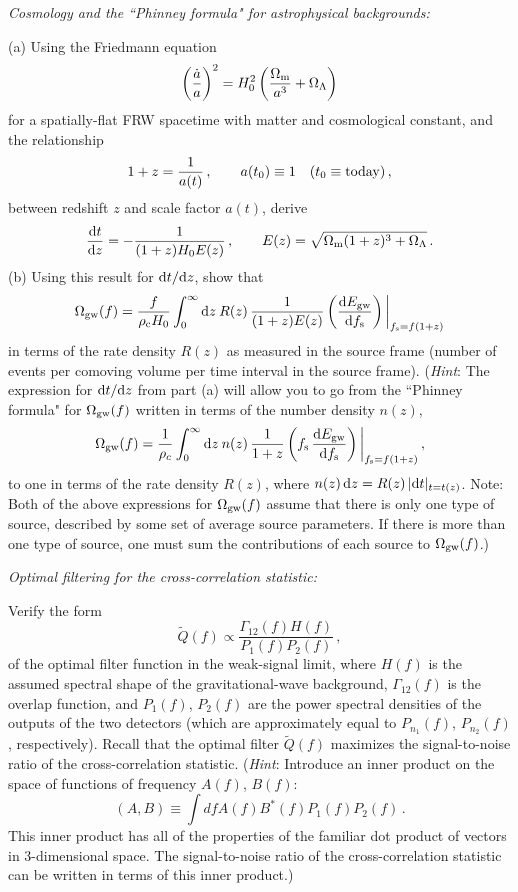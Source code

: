 \documentclass[11pt]{article}
\numberwithin{equation}{section}
\def\be{\begin{equation}}
\def\ee{\end{equation}}
\def\i{\item{}}
\def\D{{\rm d}}
\begin{document}
\i {\em Cosmology and the ``Phinney formula" for astrophysical backgrounds:}

(a) Using the Friedmann equation
%
\be
\left(\frac{\dot a}{a}\right)^2
=H_0^2\left(\frac{\Omega_{\rm m}}{a^{3}} + \Omega_\Lambda\right)
\ee
%
for a spatially-flat FRW spacetime with matter and 
cosmological constant, and the relationship 
%
\be
1+z = \frac{1}{a(t)}\,,
\qquad a(t_0)\equiv 1\quad(t_0\equiv {\rm today})\,,
\ee
%
between redshift $z$ and scale factor $a(t)$,
derive 
%
\be
\frac{\D t}{\D z} =-\frac{1}{(1+z)H_0 E(z)}\,,
\qquad
E(z) = \sqrt{\Omega_{\rm m}(1+z)^3 + \Omega_\Lambda}\,.
\ee
%
(b) Using this result for $\D t/\D z$, show that 
%
\be
\Omega_{\rm gw}(f)= \frac{f}{\rho_{\rm c}H_0}
\int_0^\infty \D z\>R(z)\,\frac{1}{(1+z)E(z)}
\left(\frac{\D E_{\rm gw}}{\D f_{\rm s}}\right)\bigg|_{f_{\rm s}=f(1+z)}
\ee
%
in terms of the rate density $R(z)$ as measured in 
the source frame 
(number of events per comoving volume per time interval
in the source frame).
({\em Hint}: The expression for $\D t/\D z$ from part
(a) will allow 
you to go from the ``Phinney formula" for
$\Omega_{\rm gw}(f)$ written in terms of the number 
density $n(z)$,
%
\be
\Omega_{\rm gw}(f)= \frac{1}{\rho_c}\int_0^\infty \D z\>
n(z)\,\frac{1}{1+z}\left(f_{\rm s}\,
\frac{\D E_{\rm gw}}{\D f_{\rm s}}\right)\bigg|_{f_{\rm s}=f(1+z)}\,,
\ee
%
to one in terms of the rate density 
$R(z)$, where $n(z)\,\D z=R(z)\,|\D t|_{t=t(z)}$.
Note: Both of the above expressions for $\Omega_{\rm gw}(f)$
assume that there is only one type of source, described by 
some set of average source parameters.  
If there is more than one type of source, one must sum
the contributions of each source to $\Omega_{\rm gw}(f)$.)

\i {\em Optimal filtering for the cross-correlation statistic:}

Verify the form 
%
\be
\tilde Q(f)\propto \frac{\Gamma_{12}(f)H(f)}
{P_1(f)P_2(f)}\,,
\ee
of the optimal filter function in the weak-signal limit,
where $H(f)$ is the assumed spectral shape of the 
gravitational-wave background,
$\Gamma_{12}(f)$ is the overlap function, and $P_1(f)$, $P_2(f)$ 
are the power spectral densities of the outputs of the 
two detectors (which are approximately equal to 
$P_{n_1}(f)$, $P_{n_2}(f)$, respectively).
Recall that the optimal filter $\tilde Q(f)$ maximizes
the signal-to-noise ratio of the cross-correlation 
statistic.
({\em Hint}: Introduce an inner product on the space of
functions of frequency $A(f)$, $B(f)$:
%
\be
(A,B)\equiv\int df A(f) B^*(f) P_1(f) P_2(f)\,.
\ee
%
This inner product
has all of the properties of the familiar dot product
of vectors in 3-dimensional space.
The signal-to-noise ratio of the cross-correlation
statistic can be written in terms of this inner product.)
\end{document}
